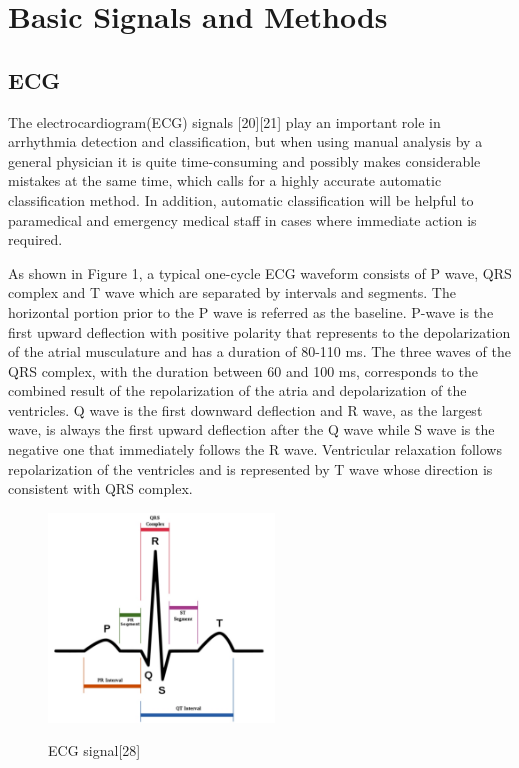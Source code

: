 \documentclass[journal]{IEEEtran}
\begin{document}
\section{Basic Signals and Methods}
\subsection{ECG}
The electrocardiogram(ECG) signals [20][21] play an important role in arrhythmia detection and classification, but when using manual analysis by a general physician it is quite time-consuming and possibly makes considerable mistakes at the same time, which calls for a highly accurate automatic classification method. In addition, automatic classification will be helpful to paramedical and emergency medical staff in cases where immediate action is required.

As shown in Figure 1, a typical one-cycle ECG waveform consists of P wave, QRS complex and T wave which are separated by intervals and segments. The horizontal portion prior to the P wave is referred as the baseline. P-wave is the first upward deflection with positive polarity that represents to the depolarization of the atrial musculature and has a duration of 80-110 ms. The three waves of the QRS complex, with the duration between 60 and 100 ms, corresponds to the combined result of the repolarization of the atria and depolarization of the ventricles. Q wave is the first downward deflection and R wave, as the largest wave, is always the first upward deflection after the Q wave while S wave is the negative one that immediately follows the R wave. Ventricular relaxation follows repolarization of the ventricles and is represented by T wave whose direction is consistent with QRS complex.


\begin{figure}[H]
	\centering
	\includegraphics[width=6cm]{ecg.pdf}\\
	\caption{ECG signal[28]}
	\label{Doc1}
\end{figure}
\end{document}

